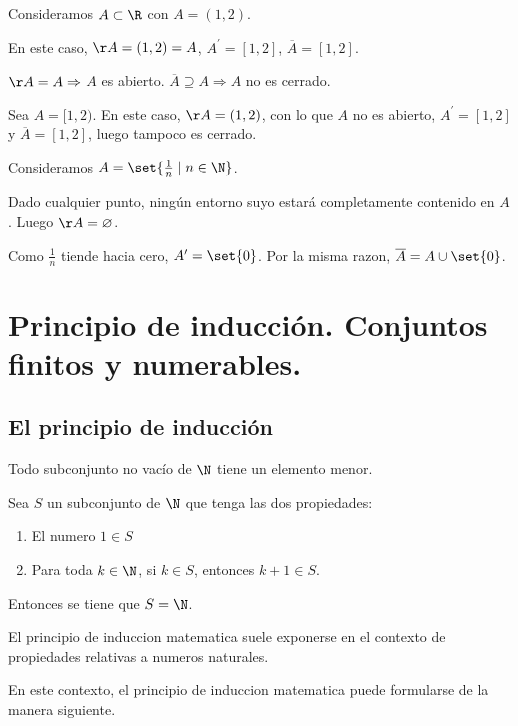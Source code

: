 \begin{example}
	Consideramos \(A \subset \R \) con \(A = (1,2 )\).
	
	En este caso, \(\AA = (1,2) = A \), \(A^\prime = [1,2]\), \(\overline{A} = [1,2]\).
	
	\(\AA = A \Rightarrow \) \(A \) es abierto. \(\overline{A} \supseteq A \Rightarrow A \) no es cerrado.
	
	
\end{example}
\begin{example}
	Sea \(A = [1,2)\). En este caso, \(\AA = (1,2)\), con lo que \(A\)  no es abierto, \(A^\prime = [1,2]\) y \(\overline{A} = [1,2]\), luego tampoco es cerrado. 
\end{example}
\begin{example}
	Consideramos \(A = \set{\frac{1}{n} \mid n \in \N }\).
	
	Dado cualquier punto, ningún entorno suyo estará completamente contenido en \(A \). Luego \(\AA = \varnothing \). 
	
	Como \(\frac{1}{n}\) tiende hacia cero, \(A^\prime  = \set{0}\). Por la misma razon, \(\overline{A} = A \cup \set{0}\).
\end{example}
\section{Principio de inducción. Conjuntos finitos y numerables.}
\subsection{El principio de inducción}
\begin{proposition}
	Todo subconjunto no vacío de \(\N \) tiene un elemento menor.
\end{proposition}
\begin{proposition}
	Sea \(S \) un subconjunto de \(\N \) que tenga las dos propiedades:
	\begin{enumerate}
		\item El numero \(1 \in S \)
		\item Para toda \(k \in \N \), si \(k \in S \), entonces \(k + 1 \in S \).
	\end{enumerate}
	Entonces se tiene que \(S = \N \).
\end{proposition}
El principio de induccion matematica suele exponerse en el contexto de propiedades relativas a numeros naturales.

En este contexto, el principio de induccion matematica puede formularse de la manera siguiente.

